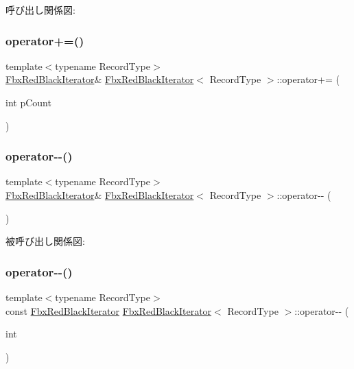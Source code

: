 呼び出し関係図\+:
\mbox{\label{class_fbx_red_black_iterator_aced77a1a0958e3f5d0b8f1a9cc47b42d}} 
\subsubsection{\texorpdfstring{operator+=()}{operator+=()}}
{\footnotesize\ttfamily template$<$typename Record\+Type$>$ \\
\hyperlink{class_fbx_red_black_iterator}{Fbx\+Red\+Black\+Iterator}\& \hyperlink{class_fbx_red_black_iterator}{Fbx\+Red\+Black\+Iterator}$<$ Record\+Type $>$\+::operator+= (\begin{DoxyParamCaption}\item[{int}]{p\+Count }\end{DoxyParamCaption})}

\mbox{\label{class_fbx_red_black_iterator_a586034c7ed6bf9ecdda3e21861d51a11}} 
\subsubsection{\texorpdfstring{operator-\/-\/()}{operator--()}\hspace{0.1cm}{\footnotesize\ttfamily [1/2]}}
{\footnotesize\ttfamily template$<$typename Record\+Type$>$ \\
\hyperlink{class_fbx_red_black_iterator}{Fbx\+Red\+Black\+Iterator}\& \hyperlink{class_fbx_red_black_iterator}{Fbx\+Red\+Black\+Iterator}$<$ Record\+Type $>$\+::operator-\/-\/ (\begin{DoxyParamCaption}{ }\end{DoxyParamCaption})}

被呼び出し関係図\+:
\mbox{\label{class_fbx_red_black_iterator_a29bd733723bc879fb8057d7ae55279b4}} 
\subsubsection{\texorpdfstring{operator-\/-\/()}{operator--()}\hspace{0.1cm}{\footnotesize\ttfamily [2/2]}}
{\footnotesize\ttfamily template$<$typename Record\+Type$>$ \\
const \hyperlink{class_fbx_red_black_iterator}{Fbx\+Red\+Black\+Iterator} \hyperlink{class_fbx_red_black_iterator}{Fbx\+Red\+Black\+Iterator}$<$ Record\+Type $>$\+::operator-\/-\/ (\begin{DoxyParamCaption}\item[{int}]{ }\end{DoxyParamCaption})}

